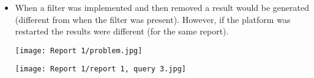 \begin{itemize}
\begin{center}
  \label{normal_case}
\end{center}
\item When a filter was implemented and then removed a result would be generated (different from when the filter was present). However, if the platform was restarted the results were different (for the same report).
\begin{center}
  \texttt{[image: Report 1/problem.jpg]}
  \label{normal_case}
\end{center}
\begin{center}
  \texttt{[image: Report 1/report 1, query 3.jpg]}
  \label{normal_case}
\end{center}

\end{itemize}

